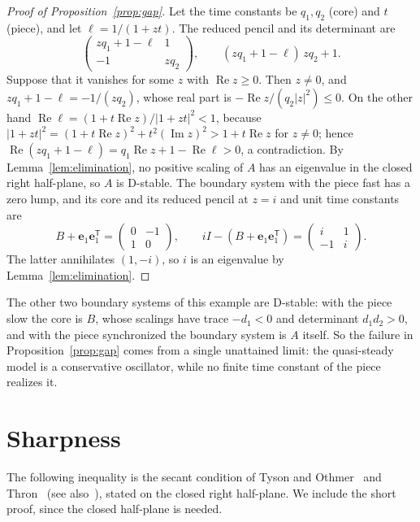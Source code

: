 \documentclass[11pt,a4paper]{article}
\theoremstyle{plain}
\theoremstyle{definition}
\theoremstyle{remark}
\newcommand{\Real}{\operatorname{Re}}
\newcommand{\Imag}{\operatorname{Im}}
\newcommand{\be}{\mathbf{e}}
\newcommand{\T}{\mathsf{T}}
\begin{document}
\begin{proof}[Proof of Proposition~\ref{prop:gap}]
Let the time constants be $q_1,q_2$ (core) and $t$ (piece), and let $\ell=1/(1+zt)$. The
reduced pencil and its determinant are
\[
  \begin{pmatrix}zq_1+1-\ell&1\\-1&zq_2\end{pmatrix},\qquad (zq_1+1-\ell)\,zq_2+1 .
\]
Suppose that it vanishes for some $z$ with $\Real z\ge0$. Then
$z\ne0$, and $zq_1+1-\ell=-1/(zq_2)$, whose real part is $-\Real z/(q_2|z|^2)\le0$. On the
other hand $\Real\ell=(1+t\Real z)/|1+zt|^2<1$, because
$|1+zt|^2=(1+t\Real z)^2+t^2(\Imag z)^2>1+t\Real z$ for $z\ne0$; hence
$\Real(zq_1+1-\ell)=q_1\Real z+1-\Real\ell>0$, a contradiction. By
Lemma~\ref{lem:elimination}, no positive scaling of $A$ has an eigenvalue in the closed
right half-plane, so $A$ is D-stable. The boundary system with the piece fast has a zero
lump, and its core and its reduced pencil at $z=i$ and unit time constants are
\[
  B+\be_1\be_1^\T=\begin{pmatrix}0&-1\\1&0\end{pmatrix},\qquad
  iI-(B+\be_1\be_1^\T)=\begin{pmatrix}i&1\\-1&i\end{pmatrix}.
\]
The latter annihilates $(1,-i)$, so $i$ is an eigenvalue by Lemma~\ref{lem:elimination}.
\end{proof}

The other two boundary systems of this example are D-stable: with the piece slow the core is
$B$, whose scalings have trace $-d_1<0$ and determinant $d_1d_2>0$, and with the piece
synchronized the boundary system is $A$ itself. So the failure in
Proposition~\ref{prop:gap} comes from a single unattained limit: the quasi-steady model is
a conservative oscillator, while no finite time constant of the piece realizes it.

\section{Sharpness}\label{sec:sharpness}

The following inequality is the secant condition of Tyson and Othmer~\cite{tyson1978} and
Thron~\cite{thron1991} (see also~\cite{sontag2006,arcak2006}), stated on the closed right
half-plane. We include the short proof, since the closed half-plane is needed.
\end{document}
